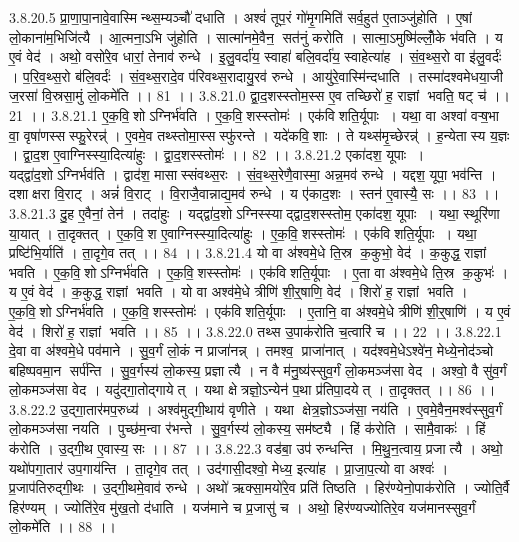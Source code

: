 3.8.20.5
प्रा॒णा॒पा॒नावे॒वास्मिन्थ्स॒म्यञ्चौ॑ दधाति । अश्वं॑ तूप॒रं गो॑मृ॒गमिति॑ सर्व॒हुत॑ ए॒ताञ्जु॑होति । ए॒षां लो॒काना॑म॒भिजि॑त्यै । आ॒त्मना॒ऽभि जु॑होति । सात्मा॑नमे॒वैन॒॒ सत॑नुं करोति । सात्मा॒ऽमुष्मि॑ल्लोँ॒के भ॑वति । य ए॒वं वेद॑ । अथो॒ वसो॑रे॒व धारां॒ तेनाव॑ रुन्धे । इ॒लु॒वर्दा॑य॒ स्वाहा॑ बलि॒वर्दा॑य॒ स्वाहेत्या॑ह । सं॒व॒थ्स॒रो वा इ॑लु॒वर्दः॑ । प॒रि॒व॒थ्स॒रो ब॑लि॒वर्दः॑ । सं॒व॒थ्स॒रादे॒व प॑रिवथ्स॒रादायु॒रव॑ रुन्धे । आयु॑रे॒वास्मि॑न्दधाति । तस्मा॑दश्वमेधया॒जी ज॒रसा॑ वि॒स्रसा॒मुं लो॒कमे॑ति ।। 81 ।।
3.8.21.0
द्वा॒द॒शस्स्तोम॒स्स ए॒व तच्छिरो॑ ह॒ राज्ञां भवति॒ षट् च॑ ।। 21 ।।
3.8.21.1
ए॒क॒वि॒शोऽग्निर्भ॑वति । ए॒क॒वि॒॒शस्स्तोमः॑ । एक॑विशति॒र्यूपाः । यथा॒ वा अश्वा॑ वऱ्ष॒भा वा॒ वृषा॑णस्सस्फु॒रेरन्न्॑ । ए॒वमे॒व तथ्स्तोमा॒स्सस्फु॑रन्ते । यदे॑कवि॒॒शाः । ते यथ्स॑मृ॒च्छेरन्न्॑ । ह॒न्येतास्य य॒ज्ञः । द्वा॒द॒श ए॒वाग्निस्स्या॒दित्या॑हुः । द्वा॒द॒शस्स्तोमः॑ ।। 82 ।।
3.8.21.2
एका॑दश॒ यूपाः । यद्द्वा॑द॒शोऽग्निर्भव॑ति । द्वाद॑श॒ मासास्संवथ्स॒रः । सं॒व॒थ्स॒रेणै॒वास्मा॒ अन्न॒मव॑ रुन्धे । यद्दश॒ यूपा॒ भव॑न्ति । दशाक्षरा वि॒राट् । अन्नं॑ वि॒राट् । वि॒राजै॒वान्नाद्य॒मव॑ रुन्धे । य ए॑काद॒शः । स्तन॑ ए॒वास्यै॒ सः ।। 83 ।।
3.8.21.3
दु॒ह ए॒वैनां॒ तेन॑ । तदा॑हुः । यद्द्वा॑द॒शोऽग्निस्स्याद्द्वाद॒शस्स्तोम॒ एका॑दश॒ यूपाः । यथा॒ स्थूरि॑णा या॒यात् । ता॒दृक्तत् । ए॒क॒वि॒॒श ए॒वाग्निस्स्या॒दित्या॑हुः । ए॒क॒वि॒॒शस्स्तोमः॑ । एक॑विशति॒र्यूपाः । यथा॒ प्रष्टि॑भि॒र्याति॑ । ता॒दृगे॒व तत् ।। 84 ।।
3.8.21.4
यो वा अ॑श्वमे॒धे ति॒स्र क॒कुभो॒ वेद॑ । क॒कुद्ध॒ राज्ञां भवति । ए॒क॒वि॒॒शोऽग्निर्भ॑वति । ए॒क॒वि॒॒शस्स्तोमः॑ । एक॑विशति॒र्यूपाः । ए॒ता वा अ॑श्वमे॒धे ति॒स्र क॒कुभः॑ । य ए॒वं वेद॑ । क॒कुद्ध॒ राज्ञां भवति । यो वा अश्व॑मे॒धे त्रीणि॑ शी॒र्॒षाणि॒ वेद॑ । शिरो॑ ह॒ राज्ञां भवति । ए॒क॒वि॒॒शोऽग्निर्भ॑वति । ए॒क॒वि॒॒शस्स्तोमः॑ । एक॑विशति॒र्यूपाः । ए॒तानि॒ वा अ॑श्वमे॒धे त्रीणि॑ शी॒र्॒षाणि॑ । य ए॒वं वेद॑ । शिरो॑ ह॒ राज्ञां भवति ।। 85 ।।
3.8.22.0
तथ्स उ॒पाक॑रोति च॒त्वारि॑ च ।। 22 ।।
3.8.22.1
दे॒वा वा अ॑श्वमे॒धे पव॑माने । सु॒व॒र्गं लो॒कं न प्राजा॑नन्न् । तमश्व॒ प्राजा॑नात् । यद॑श्वमे॒धेऽश्वे॑न॒ मेध्ये॒नोद॑ञ्चो बहिष्पवमा॒न सर्प॑न्ति । सु॒व॒र्गस्य॑ लो॒कस्य॒ प्रज्ञात्यै । न वै म॑नु॒ष्य॑स्सुव॒र्गं लो॒कमञ्ज॑सा वेद । अश्वो॒ वै सु॑व॒र्गं लो॒कमञ्ज॑सा वेद । यदु॑द्गा॒तोद्गायेत् । यथा क्षेत्रज्ञो॒ऽन्येन॑ प॒था प्र॑तिपा॒दयेत् । ता॒दृक्तत् ।। 86 ।।
3.8.22.2
उ॒द्गा॒तार॑मप॒रुध्य॑ । अश्व॑मुद्गी॒थाय॑ वृणीते । यथा क्षेत्र॒ज्ञोऽञ्ज॑सा॒ नय॑ति । ए॒वमे॒वैन॒मश्व॑स्सुव॒र्गं लो॒कमञ्ज॑सा नयति । पुच्छ॑म॒न्वा र॑भन्ते । सु॒व॒र्गस्य॑ लो॒कस्य॒ सम॑ष्ट्यै । हिं क॑रोति । सामै॒वाकः॑ । हिं क॑रोति । उ॒द्गी॒थ ए॒वास्य॒ सः ।। 87 ।।
3.8.22.3
वड॑बा॒ उप॑ रुन्धन्ति । मि॒थु॒न॒त्वाय॒ प्रजात्यै । अथो॒ यथो॑पगा॒तार॑ उप॒गाय॑न्ति । ता॒दृगे॒व तत् । उद॑गासी॒दश्वो॒ मेध्य॒ इत्या॑ह । प्रा॒जा॒प॒त्यो वा अश्वः॑ । प्र॒जाप॑तिरुद्गी॒थः । उ॒द्गी॒थमे॒वाव॑ रुन्धे । अथो॑ ऋक्सा॒मयो॑रे॒व प्रति॑ तिष्ठति । हिर॑ण्येनो॒पाक॑रोति । ज्योति॒र्वै हिर॑ण्यम् । ज्योति॑रे॒व मु॑ख॒तो द॑धाति । यज॑माने च प्र॒जासु॑ च । अथो॒ हिर॑ण्यज्योतिरे॒व यज॑मानस्सुव॒र्गं लो॒कमे॑ति ।। 88 ।।
